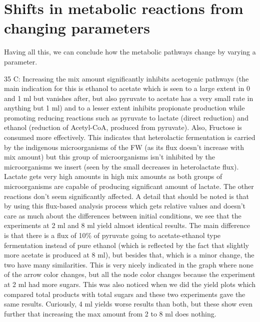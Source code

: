 \documentclass[11pt]{article}
\begin{document}
\section{Shifts in metabolic reactions from changing parameters}
\label{sec:org74c5c5e}
Having all this, we can conclude how the metabolic pathways change by varying a parameter.

35 C: Increasing the mix amount significantly inhibits acetogenic pathways (the main indication for this is ethanol to acetate which is seen to a large extent in 0 and 1 ml but vanishes after, but also pyruvate to acetate has a very small rate in anything but 1 ml) and to a lesser extent inhibits propionate production while promoting reducing reactions such as pyruvate to lactate (direct reduction) and ethanol (reduction of Acetyl-CoA, produced from pyruvate). Also, Fructose is consumed more effectively. This indicates that heterolactic fermentation is carried by the indigenous microorganisms of the FW (as its flux doesn't increase with mix amount) but this group of microorganisms isn't inhibited by the microorganisms we insert (seen by the small decreases in heterolactate flux). Lactate gets very high amounts in high mix amounts as both groups of microorganisms are capable of producing significant amount of lactate. The other reactions don't seem significantly affected. A detail that should be noted is that by using this flux-based analysis process which gets relative values and doesn't care as much about the differences between initial conditions, we see that the experiments at 2 ml and 8 ml yield almost identical results. The main difference is that there is a flux of 10\% of pyruvate going to acetate-ethanol type fermentation instead of pure ethanol (which is reflected by the fact that slightly more acetate is produced at 8 ml), but besides that, which is a minor change, the two have many similarities. This is very nicely indicated in the graph where none of the arrow color changes, but all the node color changes because the experiment at 2 ml had more sugars. This was also noticed when we did the yield plots which compared total products with total sugars and these two experiments gave the same results. Curiously, 4 ml yields worse results than both, but these show even further that increasing the max amount from 2 to 8 ml does nothing.
\end{document}

